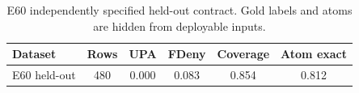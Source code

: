 \begin{table}[t]
\centering
\small
\caption{E60 independently specified held-out contract. Gold labels and atoms are hidden from deployable inputs.}
\label{tab:e60-heldout}
\begin{tabular}{lccccc}
\toprule
Dataset & Rows & UPA & FDeny & Coverage & Atom exact \\
\midrule
E60 held-out & 480 & 0.000 & 0.083 & 0.854 & 0.812 \\
\bottomrule
\end{tabular}
\end{table}

